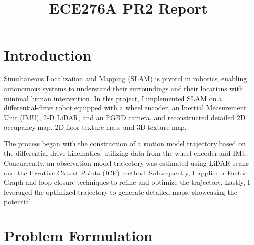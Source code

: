 \documentclass[conference]{IEEEtran}
\begin{document}
\title{ECE276A PR2 Report}

\author{
}

\maketitle


\section{Introduction}
Simultaneous Localization and Mapping (SLAM) is pivotal in robotics, 
enabling autonomous systems to understand their surroundings and their locations 
with minimal human intervention. 
In this project, I implemented SLAM on a differential-drive robot equipped with a wheel encoder, 
an Inertial Measurement Unit (IMU), 2-D LiDAR, and an RGBD camera, 
and reconstructed detailed 2D occupancy map, 2D floor texture map, and 3D texture map.

The process began with the construction of a motion model trajectory based on 
the differential-drive kinematics, 
utilizing data from the wheel encoder and IMU. 
Concurrently, an observation model trajectory was estimated using LiDAR scans 
and the Iterative Closest Points (ICP) method. 
Subsequently, I applied a Factor Graph and loop closure techniques to 
refine and optimize the trajectory. 
Lastly, I leveraged the optimized trajectory to generate 
detailed maps, showcasing the potential.


\section{Problem Formulation}
\end{document}
